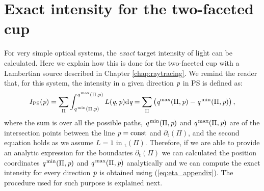 \chapter{Exact intensity for the two-faceted cup}\label{app:boundariescup}
For very simple optical systems, the \textit{exact} target intensity of light can be calculated. Here we explain how this is done for the two-faceted cup with a Lambertian source described in Chapter \ref{chap:raytracing}. We remind the reader that, for this system, the intensity in a given direction $\textit{p}$ in PS is defined as:
\begin{equation}\label{eq:eta_appendix}
I_{\textrm{PS}}(\textit{p}) = \sum_{\Pi}\int_{\textit{q}^\textrm{\,min}(\Pi, \textit{p})}^{\textit{q}^\textrm{\,max}(\Pi,\textit{p})}L(\textit{q}, \textit{p})\textrm{d}\textit{q} = \sum_{\Pi}\big (\textit{q}^\textrm{max}(\Pi,\textit{p})-\textit{q}^\textrm{\,min}(\Pi,\textit{p})\big )\,,
\end{equation}
where the sum is over all the possible paths, $\textit{q}^\textrm{\,min}(\Pi,\textit{p})$ and $\textit{q}^\textrm{\,max}(\Pi,\textit{p})$ are of the intersection points between the line $\textit{p}=\textrm{const}$ and $\partial$$_\textrm{t}(\Pi)$, and the second equation holds as we assume $L=1$ in $_\textrm{t}(\Pi)$.
Therefore, if we are able to provide an analytic expression for the boundaries $\partial$$_\textrm{t}(\Pi)$ we can calculated the position coordinates $\textit{q}^\textrm{\,min}(\Pi,\textit{p})$ and $\textit{q}^\textrm{\,max}(\Pi,\textit{p})$ analytically and we can compute the exact intensity for every direction $\textit{p}$ is obtained using (\ref{eq:eta_appendix}). The procedure used for such purpose is explained next.
